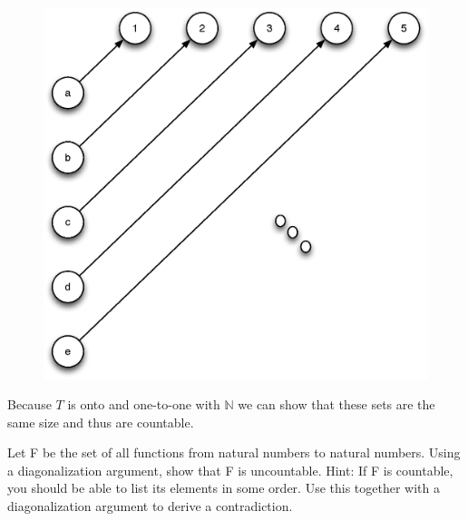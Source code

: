 \begin{problem}{1}
\begin{solution}
\begin{figure}[H]
      \includegraphics[scale=.5]{problem_1_b.eps}
      \label{fig:problem_1_b}
    \end{figure}
    Because $T$ is onto and one-to-one with $\mathbb{N}$ we can show that these sets are the same size and thus are
    countable.
  \end{solution}
\end{problem}

\begin{problem}{2}
  Let F be the set of all functions from natural numbers to natural numbers. Using a diagonalization argument, show that
  F is uncountable. Hint: If F is countable, you should be able to list its elements in some order. Use this together
  with a diagonalization argument to derive a contradiction.
\end{problem}

\begin{problem}{3}
\end{problem}

\begin{problem}{4}
\end{problem}

\begin{problem}{5}
\end{problem}

\begin{problem}{6}
\end{problem}

\begin{problem}{7}
\end{problem}




